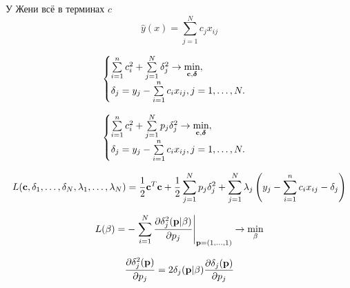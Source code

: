 
У Жени всё в терминах $c$
$$
\hat y(x) = \sum_{j=1}^N c_j x_{ij}
$$

\begin{equation}
	\begin{cases}
		\sum\limits_{i=1}^n c_i^2 + \sum\limits_{j=1}^N \delta_j^2 \to \mathop{\mbox{min}}\limits_{\boldsymbol{\mathbf{c}}, \boldsymbol{\mathbf{\delta}}}, \\
	\delta_j = y_j - \sum\limits_{i=1}^n c_ix_{ij}, j=1,\ldots,N. 
	\end{cases}
\end{equation}

\begin{equation}
	\begin{cases}
		\sum\limits_{i=1}^n c_i^2 + \sum\limits_{j=1}^N p_j\delta_j^2 \to \mathop{\mbox{min}}\limits_{\boldsymbol{\mathbf{c}}, \boldsymbol{\mathbf{\delta}}}, \\
	\delta_j = y_j - \sum\limits_{i=1}^n c_ix_{ij}, j=1,\ldots,N. 
	\end{cases}
\end{equation}



\begin{equation}
L(\boldsymbol{\mathbf{c}},\delta_{1},\ldots,\delta_{N}, \lambda_{1},\ldots,\lambda_{N}) 
	= \frac12 \boldsymbol{\mathbf{c}}^T\boldsymbol{\mathbf{c}} +  \frac12 \sum\limits_{j=1}^N p_j\delta_j^2 + \sum_{j=1}^N\lambda_j\left(y_j  - \sum\limits_{i=1}^n c_i x_{ij} - \delta_j \right)
\end{equation}

\begin{equation}
L(\beta) = - \left.\sum_{i=1}^N \frac{\partial\delta_j^2(\boldsymbol{\mathbf{p}}| \beta)}{\partial p_j}\right|_{\boldsymbol{\mathbf{p}} = (1, \ldots, 1)} \to \mathop{\mbox{min}}\limits_{\beta}
\end{equation}

\begin{equation}
\frac{\partial\delta_j^2(\boldsymbol{\mathbf{p}})}{\partial p_j} = 2 \delta_j(\boldsymbol{\mathbf{p}}| \beta)\frac{\partial\delta_j(\boldsymbol{\mathbf{p}})}{\partial p_j} 
\end{equation}


